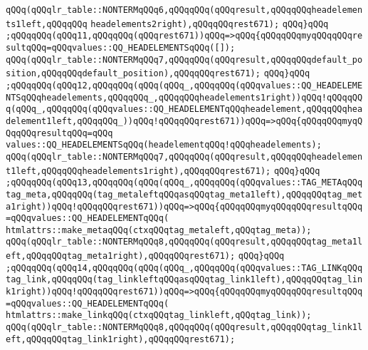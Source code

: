 \verb|qQQq(qQQqlr_table::NONTERMqQQq6,qQQqqQQq(qQQqresult,qQQqqQQqheadelements1left,qQQqqQQq|\newline
\verb|headelements2right),qQQqqQQqrest671);|\newline
\verb|qQQq}qQQq|\newline
\verb|;qQQqqQQq(qQQq11,qQQqqQQq(qQQqrest671))qQQq=>qQQq{qQQqqQQqmyqQQqqQQqresultqQQq=qQQqvalues::QQ_HEADELEMENTSqQQq([]);|\newline
\verb|qQQq(qQQqlr_table::NONTERMqQQq7,qQQqqQQq(qQQqresult,qQQqqQQqdefault_position,qQQqqQQqdefault_position),qQQqqQQqrest671);|\newline
\verb|qQQq}qQQq|\newline
\verb|;qQQqqQQq(qQQq12,qQQqqQQq(qQQq(qQQq_,qQQqqQQq(qQQqvalues::QQ_HEADELEMENTSqQQqheadelements,qQQqqQQq_,qQQqqQQqheadelements1right))qQQq!qQQqqQQq(qQQq_,qQQqqQQq(qQQqvalues::QQ_HEADELEMENTqQQqheadelement,qQQqqQQqheadelement1left,qQQqqQQq_))qQQq!qQQqqQQqrest671))qQQq=>qQQq{qQQqqQQqmyqQQqqQQqresultqQQq=qQQq|\newline
\verb|values::QQ_HEADELEMENTSqQQq(headelementqQQq!qQQqheadelements);|\newline
\verb|qQQq(qQQqlr_table::NONTERMqQQq7,qQQqqQQq(qQQqresult,qQQqqQQqheadelement1left,qQQqqQQqheadelements1right),qQQqqQQqrest671);|\newline
\verb|qQQq}qQQq|\newline
\verb|;qQQqqQQq(qQQq13,qQQqqQQq(qQQq(qQQq_,qQQqqQQq(qQQqvalues::TAG_METAqQQqtag_meta,qQQqqQQq(tag_metaleftqQQqasqQQqtag_meta1left),qQQqqQQqtag_meta1right))qQQq!qQQqqQQqrest671))qQQq=>qQQq{qQQqqQQqmyqQQqqQQqresultqQQq=qQQqvalues::QQ_HEADELEMENTqQQq(|\newline
\verb|htmlattrs::make_metaqQQq(ctxqQQqtag_metaleft,qQQqtag_meta));|\newline
\verb|qQQq(qQQqlr_table::NONTERMqQQq8,qQQqqQQq(qQQqresult,qQQqqQQqtag_meta1left,qQQqqQQqtag_meta1right),qQQqqQQqrest671);|\newline
\verb|qQQq}qQQq|\newline
\verb|;qQQqqQQq(qQQq14,qQQqqQQq(qQQq(qQQq_,qQQqqQQq(qQQqvalues::TAG_LINKqQQqtag_link,qQQqqQQq(tag_linkleftqQQqasqQQqtag_link1left),qQQqqQQqtag_link1right))qQQq!qQQqqQQqrest671))qQQq=>qQQq{qQQqqQQqmyqQQqqQQqresultqQQq=qQQqvalues::QQ_HEADELEMENTqQQq(|\newline
\verb|htmlattrs::make_linkqQQq(ctxqQQqtag_linkleft,qQQqtag_link));|\newline
\verb|qQQq(qQQqlr_table::NONTERMqQQq8,qQQqqQQq(qQQqresult,qQQqqQQqtag_link1left,qQQqqQQqtag_link1right),qQQqqQQqrest671);|\newline
